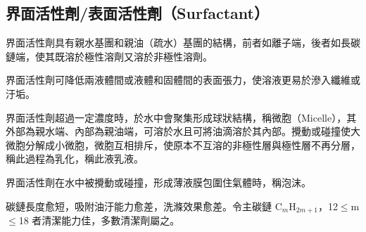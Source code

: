 \documentclass[a4paper,12pt]{report}
\begin{document}
\begin{itemize}
\begin{itemize}
\section{界面活性劑/表面活性劑（Surfactant）}
界面活性劑具有親水基團和親油（疏水）基團的結構，前者如離子端，後者如長碳鏈端，使其既溶於極性溶劑又溶於非極性溶劑。

界面活性劑可降低兩液體間或液體和固體間的表面張力，使溶液更易於滲入纖維或汙垢。

界面活性劑超過一定濃度時，於水中會聚集形成球狀結構，稱微胞（Micelle），其外部為親水端、內部為親油端，可溶於水且可將油滴溶於其內部。攪動或碰撞使大微胞分解成小微胞，微胞互相排斥，使原本不互溶的非極性層與極性層不再分層，稱此過程為乳化，稱此液乳液。

界面活性劑在水中被攪動或碰撞，形成薄液膜包圍住氣體時，稱泡沫。

碳鏈長度愈短，吸附油汙能力愈差，洗滌效果愈差。令主碳鏈 C$_m$H$_{2m+1}$，12$\leq$m$\leq$18 者清潔能力佳，多數清潔劑屬之。


\end{itemize}
\end{itemize}
\end{document}

